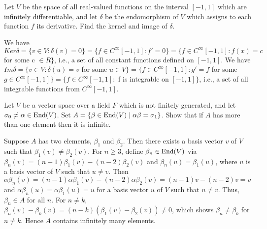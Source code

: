 \probskip

\begin{problem}[Golan 326]
Let $V$ be the space of all real-valued functions on the interval $[-1, 1]$
which are infinitely differentiable, and let $\delta$ be the endomorphism of $V$
which assigns to each function $f$ its derivative.  Find the kernel and image of
$\delta$. 
\end{problem}
\smallskip
\begin{solution}

We have $Ker\delta=\{v \in V : \delta(v)=0 \} = \{f \in C^{\infty}[-1,1] : f'=0 \} = 
\{f \in C^{\infty}[-1,1] : f(x) = c$ for some c $\in R\}$, i.e., a set of all constant 
functions defined on $[-1,1]$.
\smallskip
We have $Im\delta=\{v \in V : \delta(u)=v$ for some $u \in V \} = 
\{f \in C^{\infty}[-1,1] : g'=f$ for some $g \in C^{\infty}[-1,1] \} = 
\{f \in C^{\infty}[-1,1] : $ f is integrable on $[-1,1] \}$, i.e., a set of all 
integrable functions from $C^{\infty}[-1,1]$.

\end{solution}

\probskip

\begin{problem}[Golan 338]
Let $V$ be a vector space over a field $F$ which is not finitely generated, and
let $\sigma_0 \neq \alpha \in \operatorname{End}(V)$.  Set 
$A = \{\beta \in \operatorname{End}(V) \mid \alpha \beta = \sigma_1\}$.  Show that if $A$ has
more than one element then it is infinite.
\end{problem}
\smallskip
\begin{solution}

Suppose $A$ has two elements, $\beta_1$ and $\beta_2$. Then there exists a basis 
vector $v$ of $V$ such that $\beta_1(v) \ne \beta_2(v)$. For $n \ge 3$, define 
$\beta_n \in \operatorname{End}(V)$ via $\beta_n(v)=(n-1)\beta_1(v)-(n-2)\beta_2(v)$ and 
$\beta_n(u)=\beta_1(u)$, where $u$ is a basis vector of $V$ such that $u \ne v$. 
Then $\alpha\beta_n(v)=(n-1)\alpha\beta_1(v)-(n-2)\alpha\beta_2(v)=(n-1)v-(n-2)v=v$ 
and $\alpha\beta_n(u)=\alpha\beta_1(u)=u$ for a basis vector $u$ of $V$ such that 
$u \ne v$. Thus, $\beta_n \in A$ for all $n$. 
For $n \ne k$, $\beta_n(v)-\beta_k(v)=(n-k)(\beta_1(v)-\beta_2(v)) \ne 0$, which 
shows $\beta_n \ne \beta_k$ for $n \ne k$. Hence $A$ contains infinitely many elements.

\end{solution}

